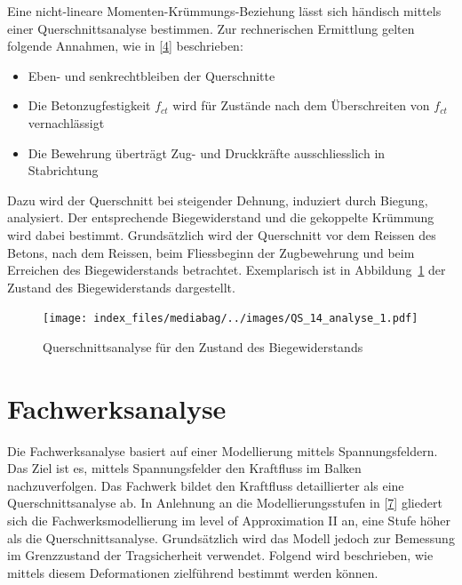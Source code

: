 \documentclass[
  12pt,
  letterpaper,
  egregdoesnotlikesansseriftitles]{scrreprt}
\providecommand{\tightlist}{%
  \setlength{\itemsep}{0pt}\setlength{\parskip}{0pt}}\usepackage{longtable,booktabs,array}
\begin{document}
Eine nicht-lineare Momenten-Krümmungs-Beziehung lässt sich händisch
mittels einer Querschnittsanalyse bestimmen. Zur rechnerischen
Ermittlung gelten folgende Annahmen, wie in
{[}\protect\hyperlink{ref-Spathelf2022}{4}{]} beschrieben:

\begin{itemize}
\tightlist
\item
  Eben- und senkrechtbleiben der Querschnitte
\item
  Die Betonzugfestigkeit \(f_{ct}\) wird für Zustände nach dem
  Überschreiten von \(f_{ct}\) vernachlässigt
\item
  Die Bewehrung überträgt Zug- und Druckkräfte ausschliesslich in
  Stabrichtung
\end{itemize}

Dazu wird der Querschnitt bei steigender Dehnung, induziert durch
Biegung, analysiert. Der entsprechende Biegewiderstand und die
gekoppelte Krümmung wird dabei bestimmt. Grundsätzlich wird der
Querschnitt vor dem Reissen des Betons, nach dem Reissen, beim
Fliessbeginn der Zugbewehrung und beim Erreichen des Biegewiderstands
betrachtet. Exemplarisch ist in Abbildung~\ref{fig-exemplar_qs_analyse}
der Zustand des Biegewiderstands dargestellt.

\begin{figure}[H]

{\centering \texttt{[image: index\_files/mediabag/../images/QS\_14\_analyse\_1.pdf]}

}

\caption{\label{fig-exemplar_qs_analyse}Querschnittsanalyse für den
Zustand des Biegewiderstands}

\end{figure}

\hypertarget{sec-fachwerk}{%
\section{Fachwerksanalyse}\label{sec-fachwerk}}

Die Fachwerksanalyse basiert auf einer Modellierung mittels
Spannungsfeldern. Das Ziel ist es, mittels Spannungsfelder den
Kraftfluss im Balken nachzuverfolgen. Das Fachwerk bildet den Kraftfluss
detaillierter als eine Querschnittsanalyse ab. In Anlehnung an die
Modellierungsstufen in {[}\protect\hyperlink{ref-Thoma2020}{7}{]}
gliedert sich die Fachwerksmodellierung im level of Approximation II an,
eine Stufe höher als die Querschnittsanalyse. Grundsätzlich wird das
Modell jedoch zur Bemessung im Grenzzustand der Tragsicherheit
verwendet. Folgend wird beschrieben, wie mittels diesem Deformationen
zielführend bestimmt werden können.
\end{document}
